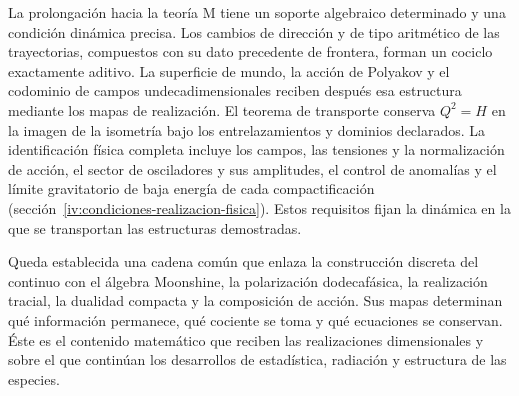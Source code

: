La prolongación hacia la teoría M tiene un soporte algebraico
determinado y una condición dinámica precisa. Los cambios de dirección
y de tipo aritmético de las trayectorias, compuestos con su dato
precedente de frontera, forman un cociclo exactamente aditivo.
La superficie de mundo, la acción de Polyakov y el codominio de campos
undecadimensionales reciben después esa estructura mediante los mapas
de realización. El teorema de transporte conserva \(Q^2=H\) en la
imagen de la isometría bajo los entrelazamientos y dominios declarados.
La identificación física completa incluye los campos, las tensiones
y la normalización de acción, el sector de osciladores y sus amplitudes,
el control de anomalías y el límite gravitatorio de baja energía de
cada compactificación
(sección~\ref{iv:condiciones-realizacion-fisica}).
Estos requisitos fijan la dinámica en la que se transportan las
estructuras demostradas.

Queda establecida una cadena común que enlaza la construcción discreta
del continuo con el álgebra Moonshine, la polarización dodecafásica,
la realización tracial, la dualidad compacta y la composición de acción.
Sus mapas determinan qué información permanece, qué cociente se toma
y qué ecuaciones se conservan. Éste es el contenido matemático que
reciben las realizaciones dimensionales y sobre el que continúan los
desarrollos de estadística, radiación y estructura de las especies.

\par\endgroup
